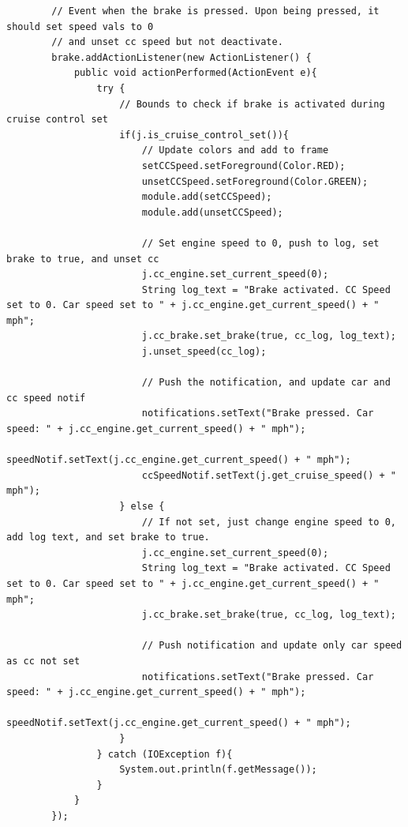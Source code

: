 \documentclass[preprint,11pt,3p]{article}
\begin{document}
\begin{lstlisting}
        // Event when the brake is pressed. Upon being pressed, it should set speed vals to 0
        // and unset cc speed but not deactivate.
        brake.addActionListener(new ActionListener() { 
            public void actionPerformed(ActionEvent e){ 
                try {  
                	// Bounds to check if brake is activated during cruise control set
                    if(j.is_cruise_control_set()){ 
                    	// Update colors and add to frame
                        setCCSpeed.setForeground(Color.RED);
                        unsetCCSpeed.setForeground(Color.GREEN); 
                        module.add(setCCSpeed);
                        module.add(unsetCCSpeed);

                        // Set engine speed to 0, push to log, set brake to true, and unset cc
                        j.cc_engine.set_current_speed(0);
                        String log_text = "Brake activated. CC Speed set to 0. Car speed set to " + j.cc_engine.get_current_speed() + " mph";
                        j.cc_brake.set_brake(true, cc_log, log_text);
                        j.unset_speed(cc_log);

                        // Push the notification, and update car and cc speed notif
                        notifications.setText("Brake pressed. Car speed: " + j.cc_engine.get_current_speed() + " mph");
                        speedNotif.setText(j.cc_engine.get_current_speed() + " mph");
                        ccSpeedNotif.setText(j.get_cruise_speed() + " mph");
                    } else { 
                    	// If not set, just change engine speed to 0, add log text, and set brake to true.
                    	j.cc_engine.set_current_speed(0);
                        String log_text = "Brake activated. CC Speed set to 0. Car speed set to " + j.cc_engine.get_current_speed() + " mph";
                        j.cc_brake.set_brake(true, cc_log, log_text);

                        // Push notification and update only car speed as cc not set
                        notifications.setText("Brake pressed. Car speed: " + j.cc_engine.get_current_speed() + " mph");
                        speedNotif.setText(j.cc_engine.get_current_speed() + " mph");
                    }
                } catch (IOException f){ 
                    System.out.println(f.getMessage());
                }
            }
        });


\end{lstlisting}
\end{document}
